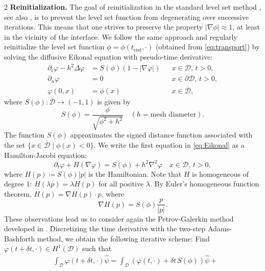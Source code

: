 \documentclass[a4paper, oneside]{article}
\begin{document}
\begin{multicols}{2}
\textbf{Reinitialization.} 
The goal of reinitialization in the standard level set method \cite{MR965860}, see also \cite{MR3843884}, is to prevent the level set function from degenerating over successive iterations.
This means that one strives to preserve the property $|\nabla\phi|\approx 1$, at least in the vicinity of the interface.
We follow the same approach and regularly reinitialize the level set function $\phi = \phi(t_{\text{end}}, \cdot)$
(obtained from \eqref{eq:transport})
by solving the diffusive Eikonal equation with pseudo-time derivative:
\begin{equation} \label{eq:Eikonal}
\begin{aligned}
    \partial_t \varphi - h^2 \Delta \varphi &= S(\phi)(1 - |\nabla \varphi|)
    && x\in \mathcal{D},\, t>0, \\
    \partial_n \varphi &= 0
    && x\in \partial\mathcal{D},\, t>0, \\
	\varphi(0, x) &= \phi(x)
	&& x\in \overline{\mathcal{D}},
\end{aligned}
\end{equation}
where $S(\phi):\overline{\mathcal{D}}\rightarrow (-1, 1)$ is given by 
\begin{equation*}
	S(\phi) = \frac{\phi}{\sqrt{\phi^2 + h^2}}\quad (h= \text{mesh diameter}).
\end{equation*}
The function $S(\phi)$ approximates the signed distance function associated
with the set $\{x\in\overline{\mathcal{D}} \mid \phi(x)<0\}$.
We write the first equation in \eqref{eq:Eikonal}
as a Hamilton-Jacobi equation:
\begin{equation} \label{eq:HJ}
	\partial_t \varphi + H(\nabla \varphi) =
	S(\phi) + h^2 \nabla^2\varphi \quad x\in \mathcal{D},\, t>0,
\end{equation}
where $H(p) \coloneqq S(\phi) |p|$ is the Hamiltonian.
Note that $H$ is homogeneous of degree $1$: $H(\lambda p) = \lambda H(p)$
for all positive $\lambda$. By Euler's homogeneous function theorem,
$H(p) = \nabla H (p) \cdot p$, where
\begin{equation}\label{eq:grad_H}
	\nabla H (p) = S(\phi)\frac{p}{|p|}.
\end{equation}
These observations lead us to consider again
the Petrov-Galerkin method developed in \cite{MR1640142}. 
Discretizing the time derivative with the two-step Adams-Bashforth method,
we obtain the following iterative scheme:
Find $\varphi(t + \delta t, \cdot) \in H^1(\mathcal{D})$ such that
\begin{align} \label{eq:weak_HJ}
	& \int_{\mathcal{D}}  \varphi(t + \delta t, \cdot) \hat{\psi} = \int_{\mathcal{D}} (\varphi(t, \cdot) + {\delta t} \, S(\phi)) \hat{\psi} + {}\nonumber \\

\end{align}
\end{multicols}
\end{document}
